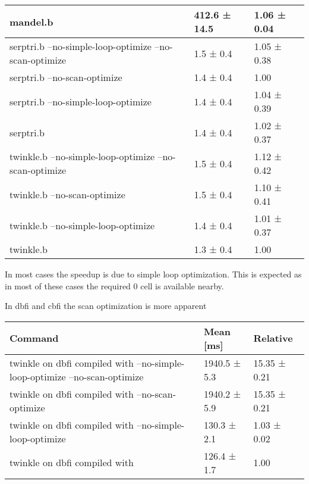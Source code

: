 \documentclass[11pt,answers]{exam}
\begin{document}
\begin{table}[H]
\begin{tabular}{|l|l|l|}
		mandel.b                                                    & 412.6 ± 14.5       & 1.06 ± 0.04       \\ \hline
		\hline
		serptri.b --no-simple-loop-optimize --no-scan-optimize      & 1.5 ± 0.4          & 1.05 ± 0.38       \\ \hline
		serptri.b --no-scan-optimize                                & 1.4 ± 0.4          & 1.00              \\ \hline
		serptri.b --no-simple-loop-optimize                         & 1.4 ± 0.4          & 1.04 ± 0.39       \\ \hline
		serptri.b                                                   & 1.4 ± 0.4          & 1.02 ± 0.37       \\ \hline
		\hline
		twinkle.b --no-simple-loop-optimize --no-scan-optimize      & 1.5 ± 0.4          & 1.12 ± 0.42       \\ \hline
		twinkle.b --no-scan-optimize                                & 1.5 ± 0.4          & 1.10 ± 0.41       \\ \hline
		twinkle.b --no-simple-loop-optimize                         & 1.4 ± 0.4          & 1.01 ± 0.37       \\ \hline
		twinkle.b                                                   & 1.3 ± 0.4          & 1.00              \\ \hline
	\end{tabular}
\end{table}

In most cases the speedup is due to simple loop optimization. This is expected as in most of these cases the required 0 cell is available nearby.

In dbfi and cbfi the scan optimization is more apparent
\begin{table}[H]
	\centering
	\begin{tabular}{|l|l|l|}
		\hline
		\textbf{Command}                                                           & \textbf{Mean [ms]} & \textbf{Relative} \\ \hline
		twinkle on dbfi compiled with --no-simple-loop-optimize --no-scan-optimize & 1940.5 ± 5.3       & 15.35 ± 0.21      \\ \hline
		twinkle on dbfi compiled with --no-scan-optimize                           & 1940.2 ± 5.9       & 15.35 ± 0.21      \\ \hline
		twinkle on dbfi compiled with --no-simple-loop-optimize                    & 130.3 ± 2.1        & 1.03 ± 0.02       \\ \hline
		twinkle on dbfi compiled with                                              & 126.4 ± 1.7        & 1.00              \\ \hline
	\end{tabular}
\end{table}
\end{document}
